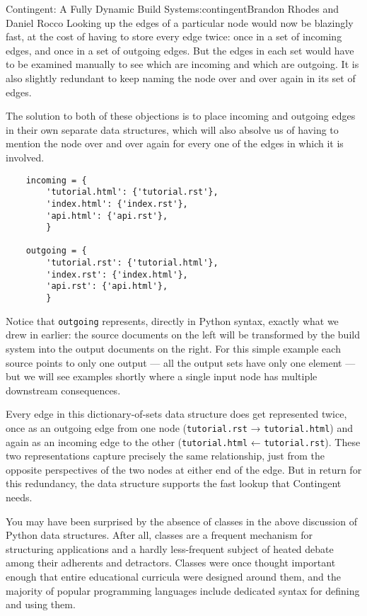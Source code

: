 \begin{aosachapter}{Contingent: A Fully Dynamic Build System}{s:contingent}{Brandon Rhodes and Daniel Rocco}
Looking up the edges of a particular node would now be blazingly fast,
at the cost of having to store every edge twice: once in a set of
incoming edges, and once in a set of outgoing edges. But the edges in
each set would have to be examined manually to see which are incoming
and which are outgoing. It is also slightly redundant to keep naming the
node over and over again in its set of edges.

The solution to both of these objections is to place incoming and
outgoing edges in their own separate data structures, which will also
absolve us of having to mention the node over and over again for every
one of the edges in which it is involved.

\begin{verbatim}
    incoming = {
        'tutorial.html': {'tutorial.rst'},
        'index.html': {'index.rst'},
        'api.html': {'api.rst'},
        }

    outgoing = {
        'tutorial.rst': {'tutorial.html'},
        'index.rst': {'index.html'},
        'api.rst': {'api.html'},
        }
\end{verbatim}

Notice that \texttt{outgoing} represents, directly in Python syntax,
exactly what we drew in  earlier: the
source documents on the left will be transformed by the build system
into the output documents on the right. For this simple example each
source points to only one output --- all the output sets have only one
element --- but we will see examples shortly where a single input node
has multiple downstream consequences.

Every edge in this dictionary-of-sets data structure does get
represented twice, once as an outgoing edge from one node
(\texttt{tutorial.rst} → \texttt{tutorial.html}) and again as an
incoming edge to the other (\texttt{tutorial.html} ←
\texttt{tutorial.rst}). These two representations capture precisely the
same relationship, just from the opposite perspectives of the two nodes
at either end of the edge. But in return for this redundancy, the data
structure supports the fast lookup that Contingent needs.

\label{the-proper-use-of-classes}

You may have been surprised by the absence of classes in the above
discussion of Python data structures. After all, classes are a frequent
mechanism for structuring applications and a hardly less-frequent
subject of heated debate among their adherents and detractors. Classes
were once thought important enough that entire educational curricula
were designed around them, and the majority of popular programming
languages include dedicated syntax for defining and using them.


\end{aosachapter}
